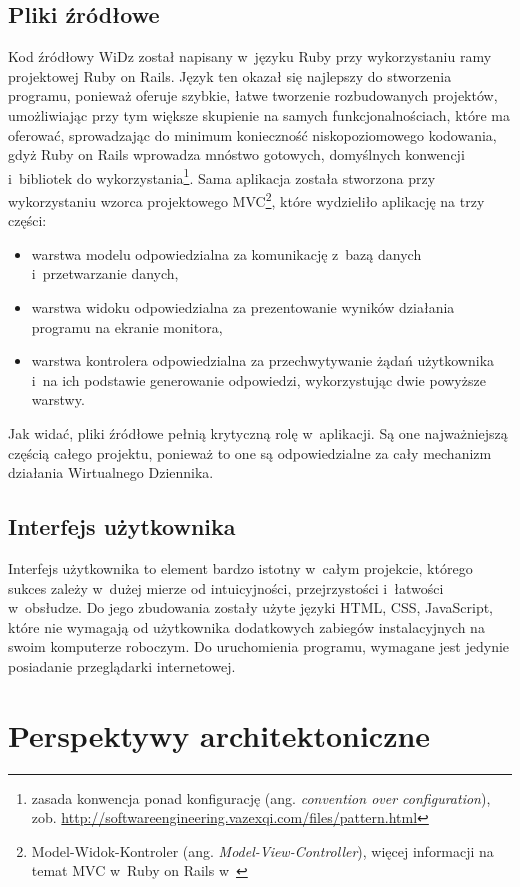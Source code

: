 \documentclass[12pt,leqno,twoside]{mwart}
\begin{document}
\subsection{Pliki źródłowe}
\noindent Kod źródłowy WiDz został napisany w~języku Ruby przy wykorzystaniu ramy projektowej Ruby on Rails. Język ten okazał się najlepszy do stworzenia programu, ponieważ oferuje szybkie, łatwe tworzenie rozbudowanych projektów, umożliwiając przy tym większe skupienie na samych funkcjonalnościach, które ma oferować, sprowadzając do minimum konieczność niskopoziomowego kodowania, gdyż Ruby on Rails wprowadza mnóstwo gotowych, domyślnych konwencji i~bibliotek do wykorzystania\footnote{zasada konwencja ponad konfigurację (ang. \textit{convention over configuration}), zob. \url{http://softwareengineering.vazexqi.com/files/pattern.html}}. Sama aplikacja została stworzona przy wykorzystaniu wzorca projektowego MVC\footnote{Model-Widok-Kontroler (ang. \textit{Model-View-Controller}), więcej informacji na temat MVC w~Ruby on Rails w~\cite{SP}}, które wydzieliło aplikację na trzy części:
\begin{itemize}
\item warstwa modelu odpowiedzialna za komunikację z~bazą danych i~przetwarzanie danych,
\item warstwa widoku odpowiedzialna za prezentowanie wyników działania programu na ekranie monitora,
\item warstwa kontrolera odpowiedzialna za przechwytywanie żądań użytkownika i~na ich podstawie generowanie odpowiedzi, wykorzystując dwie powyższe warstwy.
\end{itemize}
Jak widać, pliki źródłowe pełnią krytyczną rolę w~aplikacji. Są one najważniejszą częścią całego projektu, ponieważ to one są odpowiedzialne za cały mechanizm działania Wirtualnego Dziennika.

\subsection{Interfejs użytkownika}
\noindent Interfejs użytkownika to element bardzo istotny w~całym projekcie, którego sukces zależy w~dużej mierze od intuicyjności, przejrzystości i~łatwości w~obsłudze. Do jego zbudowania zostały użyte języki HTML, CSS, JavaScript, które nie wymagają od użytkownika dodatkowych zabiegów instalacyjnych na swoim komputerze roboczym. Do uruchomienia programu, wymagane jest jedynie posiadanie przeglądarki internetowej.

\section{Perspektywy architektoniczne}
\end{document}
